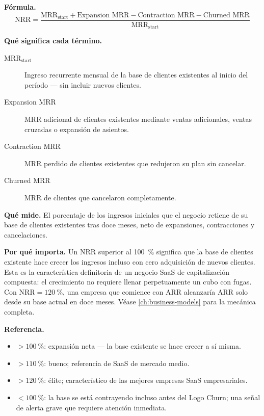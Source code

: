 \textbf{Fórmula.}
\[
  \mathrm{NRR} = \frac{\text{MRR}_\text{start} + \text{Expansion MRR} - \text{Contraction MRR} - \text{Churned MRR}}{\text{MRR}_\text{start}}
\]

\textbf{Qué significa cada término.}
\begin{description}
  \item[MRR$_\text{start}$] Ingreso recurrente mensual de la base de clientes existentes al
    inicio del período --- sin incluir nuevos clientes.
  \item[Expansion MRR] MRR adicional de clientes existentes mediante ventas adicionales,
    ventas cruzadas o expansión de asientos.
  \item[Contraction MRR] MRR perdido de clientes existentes que redujeron su plan sin
    cancelar.
  \item[Churned MRR] MRR de clientes que cancelaron completamente.
\end{description}

\textbf{Qué mide.} El porcentaje de los ingresos iniciales que el negocio retiene de su
base de clientes existentes tras doce meses, neto de expansiones, contracciones y
cancelaciones.

\textbf{Por qué importa.} Un NRR superior al \qty{100}{\percent} significa que la base de
clientes existente hace crecer los ingresos incluso con cero adquisición de nuevos clientes.
Esta es la característica definitoria de un negocio SaaS de capitalización compuesta: el
crecimiento no requiere llenar perpetuamente un cubo con fugas. Con
$\mathrm{NRR} = \qty{120}{\percent}$, una empresa que comience con  ARR
alcanzaría  ARR solo desde su base actual en doce meses. Véase
\cref{ch:business-models} para la mecánica completa.

\textbf{Referencia.}
\begin{itemize}
  \item $>\qty{100}{\percent}$: expansión neta --- la base existente se hace crecer a sí
    misma.
  \item $>\qty{110}{\percent}$: bueno; referencia de SaaS de mercado medio.
  \item $>\qty{120}{\percent}$: élite; característico de las mejores empresas SaaS
    empresariales.
  \item $<\qty{100}{\percent}$: la base se está contrayendo incluso antes del Logo Churn;
    una señal de alerta grave que requiere atención inmediata.
\end{itemize}

